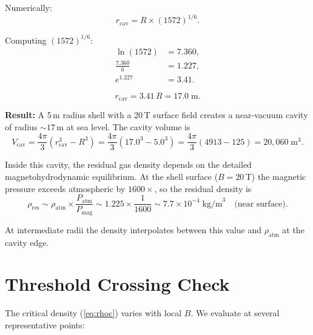 \documentclass[12pt,a4paper]{article}
\begin{document}
Numerically:
\begin{equation}
  r_{\text{cav}} = R \times (1572)^{1/6}.
\end{equation}

Computing $(1572)^{1/6}$:
\begin{align}
  \ln(1572) &= 7.360, \\
  \frac{7.360}{6} &= 1.227, \\
  e^{1.227} &= 3.41.
\end{align}

\begin{equation}
  \boxed{r_{\text{cav}} = 3.41 \, R = 17.0 \; \text{m}.}
\end{equation}

\textbf{Result:} A 5\,m radius shell with a 20\,T surface field creates a near-vacuum
cavity of radius $\sim 17$\,m at sea level.  The cavity volume is
\begin{equation}
  V_{\text{cav}} = \frac{4\pi}{3}\left(r_{\text{cav}}^3 - R^3\right)
    = \frac{4\pi}{3}\left(17.0^3 - 5.0^3\right)
    = \frac{4\pi}{3}(4913 - 125)
    = 20{,}060 \; \text{m}^3.
\end{equation}

Inside this cavity, the residual gas density depends on the detailed magnetohydrodynamic
equilibrium.  At the shell surface ($B = 20$\,T) the magnetic pressure exceeds
atmospheric by $1600\times$, so the residual density is
\begin{equation}
  \rho_{\text{res}} \sim \rho_{\text{atm}} \times \frac{P_{\text{atm}}}{P_{\text{mag}}}
    \sim 1.225 \times \frac{1}{1600}
    \sim 7.7 \times 10^{-4} \; \text{kg/m}^3 \quad \text{(near surface)}.
\end{equation}

At intermediate radii the density interpolates between this value and $\rho_{\text{atm}}$
at the cavity edge.

\section{Threshold Crossing Check}
\label{sec:threshold}

The critical density (\ref{eq:rhoc}) varies with local $B$.  We evaluate at several
representative points:
\end{document}
